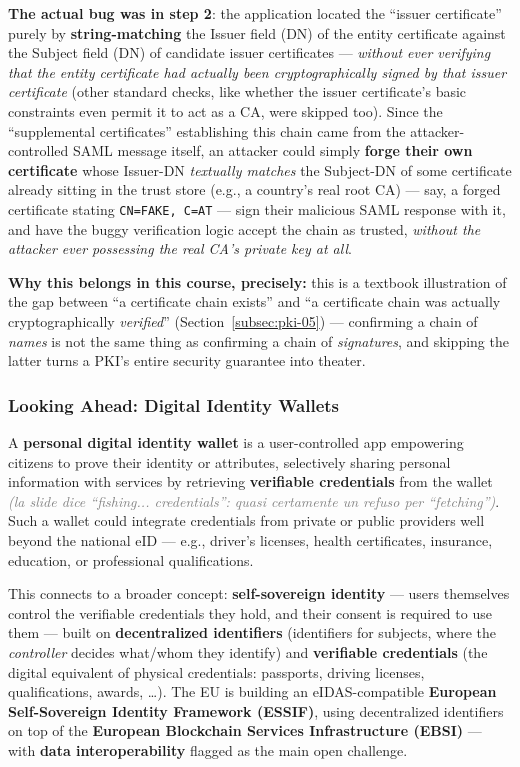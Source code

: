 \documentclass[12pt, a4paper]{article}
\begin{document}
\textcolor{red!70!black}{\textbf{The actual bug was in step 2}}: the application located the ``issuer certificate'' purely by \textbf{string-matching} the Issuer field (DN) of the entity certificate against the Subject field (DN) of candidate issuer certificates --- \emph{without ever verifying that the entity certificate had actually been cryptographically signed by that issuer certificate} (other standard checks, like whether the issuer certificate's basic constraints even permit it to act as a CA, were skipped too). Since the ``supplemental certificates'' establishing this chain came from the attacker-controlled SAML message itself, an attacker could simply \textbf{forge their own certificate} whose Issuer-DN \emph{textually matches} the Subject-DN of some certificate already sitting in the trust store (e.g., a country's real root CA) — say, a forged certificate stating \texttt{CN=FAKE, C=AT} — sign their malicious SAML response with it, and have the buggy verification logic accept the chain as trusted, \emph{without the attacker ever possessing the real CA's private key at all}.

\textcolor{blue!50!black}{\textbf{Why this belongs in this course, precisely:}} this is a textbook illustration of the gap between ``a certificate chain exists'' and ``a certificate chain was actually cryptographically \emph{verified}'' (Section~\ref{subsec:pki-05}) --- confirming a chain of \emph{names} is not the same thing as confirming a chain of \emph{signatures}, and skipping the latter turns a PKI's entire security guarantee into theater.

\subsubsection{Looking Ahead: Digital Identity Wallets}
A \textbf{personal digital identity wallet} is a user-controlled app empowering citizens to prove their identity or attributes, selectively sharing personal information with services by retrieving \textbf{verifiable credentials} from the wallet \textcolor{gray}{\textit{(la slide dice ``fishing... credentials'': quasi certamente un refuso per ``fetching'')}}. Such a wallet could integrate credentials from private or public providers well beyond the national eID --- e.g., driver's licenses, health certificates, insurance, education, or professional qualifications.

This connects to a broader concept: \textbf{self-sovereign identity} --- users themselves control the verifiable credentials they hold, and their consent is required to use them --- built on \textbf{decentralized identifiers} (identifiers for subjects, where the \emph{controller} decides what/whom they identify) and \textbf{verifiable credentials} (the digital equivalent of physical credentials: passports, driving licenses, qualifications, awards, \dots). The EU is building an eIDAS-compatible \textbf{European Self-Sovereign Identity Framework (ESSIF)}, using decentralized identifiers on top of the \textbf{European Blockchain Services Infrastructure (EBSI)} --- with \textbf{data interoperability} flagged as the main open challenge.
\end{document}
